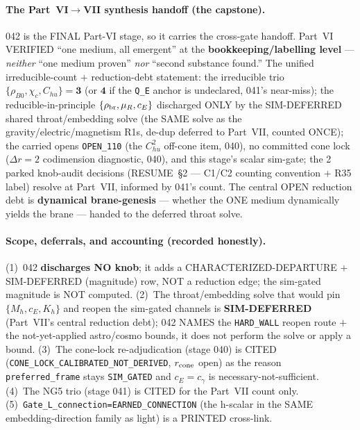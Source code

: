\paragraph{The Part~VI$\to$VII synthesis handoff (the capstone).}
042 is the FINAL Part-VI stage, so it carries the cross-gate handoff. Part~VI
VERIFIED ``one medium, all emergent'' at the \textbf{bookkeeping/labelling level}
--- \emph{neither} ``one medium proven'' \emph{nor} ``second substance found.''
The unified irreducible-count \(+\) reduction-debt statement: the irreducible trio
\(\{\rho_{B0},\chi_c,C_{hu}\}=\mathbf{3}\) (or \(\mathbf{4}\) if the \texttt{Q\_E}
anchor is undeclared, 041's near-miss); the reducible-in-principle
\(\{\rho_{\rm br},\mu_R,c_E\}\) discharged ONLY by the SIM-DEFERRED shared
throat/embedding solve (the SAME solve as the gravity/electric/magnetism R1s,
de-dup deferred to Part~VII, counted ONCE); the carried opens \texttt{OPEN\_110}
(the \(C_{hu}^2\) off-cone item, 040), no committed cone lock (\(\Delta r{=}2\)
codimension diagnostic, 040), and this stage's scalar sim-gate; the 2 parked
knob-audit decisions (RESUME~\S2 --- C1/C2 counting convention \(+\) R35 label)
resolve at Part~VII, informed by 041's count. The central OPEN reduction debt is
\textbf{dynamical brane-genesis} --- whether the ONE medium dynamically yields the
brane --- handed to the deferred throat solve.

\paragraph{Scope, deferrals, and accounting (recorded honestly).}
(1)~042 \textbf{discharges NO knob}; it adds a CHARACTERIZED-DEPARTURE
\(+\) SIM-DEFERRED (magnitude) row, NOT a reduction edge; the sim-gated magnitude
is NOT computed. (2)~The throat/embedding solve that would pin
\(\{M_h,c_E,K_h\}\) and reopen the sim-gated channels is \textbf{SIM-DEFERRED}
(Part~VII's central reduction debt); 042 NAMES the \texttt{HARD\_WALL} reopen
route \(+\) the not-yet-applied astro/cosmo bounds, it does not perform the solve
or apply a bound. (3)~The cone-lock re-adjudication (stage 040) is CITED
(\texttt{CONE\_LOCK\_CALIBRATED\_NOT\_DERIVED}, \(r_{\rm cone}\) open) as the
reason \texttt{preferred\_frame} stays \texttt{SIM\_GATED} and \(c_E{=}c_\gamma\)
is necessary-not-sufficient. (4)~The NG5 trio (stage 041) is CITED for the
Part~VII count only. (5)~\texttt{Gate\_L\_connection=EARNED\_CONNECTION} (the
h-scalar in the SAME embedding-direction family as light) is a PRINTED cross-link.

